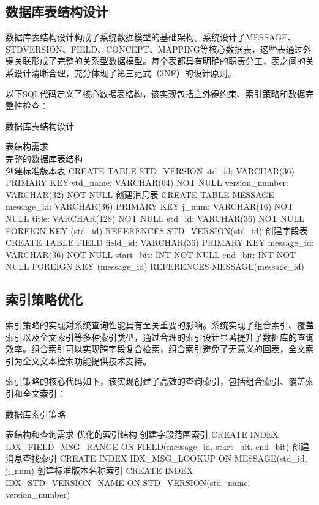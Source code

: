 \subsection{数据库表结构设计}

数据库表结构设计构成了系统数据模型的基础架构。系统设计了MESSAGE、STDVERSION、FIELD、CONCEPT、MAPPING等核心数据表，这些表通过外键关联形成了完整的关系型数据模型。每个表都具有明确的职责分工，表之间的关系设计清晰合理，充分体现了第三范式（3NF）的设计原则。

以下SQL代码定义了核心数据表结构，该实现包括主外键约束、索引策略和数据完整性检查：

\begin{algorithm}[H]
\caption{数据库表结构设计}
\begin{algorithmic}[1]
\REQUIRE 表结构需求 \\
\ENSURE 完整的数据库表结构 \\
\STATE 创建标准版本表
\STATE CREATE TABLE STD\_VERSION
\STATE std\_id: VARCHAR(36) PRIMARY KEY
\STATE std\_name: VARCHAR(64) NOT NULL
\STATE version\_number: VARCHAR(32) NOT NULL
\STATE 创建消息表
\STATE CREATE TABLE MESSAGE
\STATE message\_id: VARCHAR(36) PRIMARY KEY
\STATE j\_num: VARCHAR(16) NOT NULL
\STATE title: VARCHAR(128) NOT NULL
\STATE std\_id: VARCHAR(36) NOT NULL
\STATE FOREIGN KEY (std\_id) REFERENCES STD\_VERSION(std\_id)
\STATE 创建字段表
\STATE CREATE TABLE FIELD
\STATE field\_id: VARCHAR(36) PRIMARY KEY
\STATE message\_id: VARCHAR(36) NOT NULL
\STATE start\_bit: INT NOT NULL
\STATE end\_bit: INT NOT NULL
\STATE FOREIGN KEY (message\_id) REFERENCES MESSAGE(message\_id)
\end{algorithmic}
\end{algorithm}

\subsection{索引策略优化}

索引策略的实现对系统查询性能具有至关重要的影响。系统实现了组合索引、覆盖索引以及全文索引等多种索引类型，通过合理的索引设计显著提升了数据库的查询效率。组合索引可以实现跨字段复合检索，组合索引避免了无意义的回表，全文索引为全文文本检索功能提供技术支持。

索引策略的核心代码如下，该实现创建了高效的查询索引，包括组合索引、覆盖索引和全文索引：

\begin{algorithm}[H]
\caption{数据库索引策略}
\begin{algorithmic}[1]
\REQUIRE 表结构和查询需求
\ENSURE 优化的索引结构
\STATE 创建字段范围索引
\STATE CREATE INDEX IDX\_FIELD\_MSG\_RANGE ON FIELD(message\_id, start\_bit, end\_bit)
\STATE 创建消息查找索引
\STATE CREATE INDEX IDX\_MSG\_LOOKUP ON MESSAGE(std\_id, j\_num)
\STATE 创建标准版本名称索引
\STATE CREATE INDEX IDX\_STD\_VERSION\_NAME ON STD\_VERSION(std\_name, version\_number)
\end{algorithmic}
\end{algorithm}

